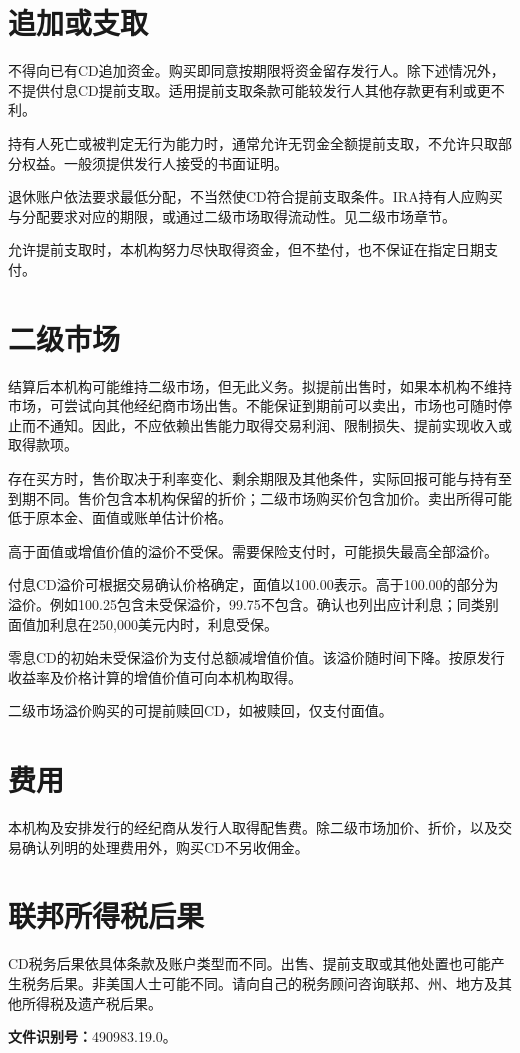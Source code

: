 \documentclass[UTF8,fontset=none,11pt,a4paper]{ctexart}
\begin{document}
\section*{追加或支取}
不得向已有CD追加资金。购买即同意按期限将资金留存发行人。除下述情况外，不提供付息CD提前支取。适用提前支取条款可能较发行人其他存款更有利或更不利。


持有人死亡或被判定无行为能力时，通常允许无罚金全额提前支取，不允许只取部分权益。一般须提供发行人接受的书面证明。


退休账户依法要求最低分配，不当然使CD符合提前支取条件。IRA持有人应购买与分配要求对应的期限，或通过二级市场取得流动性。见二级市场章节。


允许提前支取时，本机构努力尽快取得资金，但不垫付，也不保证在指定日期支付。


\section*{二级市场}
结算后本机构可能维持二级市场，但无此义务。拟提前出售时，如果本机构不维持市场，可尝试向其他经纪商市场出售。不能保证到期前可以卖出，市场也可随时停止而不通知。因此，不应依赖出售能力取得交易利润、限制损失、提前实现收入或取得款项。


存在买方时，售价取决于利率变化、剩余期限及其他条件，实际回报可能与持有至到期不同。售价包含本机构保留的折价；二级市场购买价包含加价。卖出所得可能低于原本金、面值或账单估计价格。


高于面值或增值价值的溢价不受保。需要保险支付时，可能损失最高全部溢价。


付息CD溢价可根据交易确认价格确定，面值以100.00表示。高于100.00的部分为溢价。例如100.25包含未受保溢价，99.75不包含。确认也列出应计利息；同类别面值加利息在250,000美元内时，利息受保。


零息CD的初始未受保溢价为支付总额减增值价值。该溢价随时间下降。按原发行收益率及价格计算的增值价值可向本机构取得。


二级市场溢价购买的可提前赎回CD，如被赎回，仅支付面值。


\section*{费用}
本机构及安排发行的经纪商从发行人取得配售费。除二级市场加价、折价，以及交易确认列明的处理费用外，购买CD不另收佣金。


\section*{联邦所得税后果}
CD税务后果依具体条款及账户类型而不同。出售、提前支取或其他处置也可能产生税务后果。非美国人士可能不同。请向自己的税务顾问咨询联邦、州、地方及其他所得税及遗产税后果。


\textbf{文件识别号：}490983.19.0。
\end{document}
